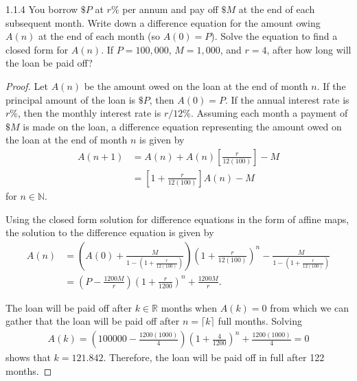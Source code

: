 \begin{problem}{1.1.4}
  You borrow $\$P$ at $r\%$ per annum
  and pay off $\$M$ at the end of each subsequent month. Write down a difference
  equation for the amount owing $A(n)$ at the end of each month (so $A(0) = P$).
  Solve the equation to find a closed form for $A(n)$. If $P = 100,000$, $M = 1,000$,
  and $r=4$, after how long will the loan be paid off?
\end{problem}

\begin{proof}
  Let $A(n)$ be the amount owed on the loan at the end of month $n$. If the principal
  amount of the loan is $\$P$, then $A(0) = P$. If the annual interest rate is $r\%$,
  then the monthly interest rate is $r/12 \%$. Assuming each month a payment of $\$M$ is
  made on the loan, a difference equation representing the amount owed on the loan
  at the end of month $n$ is given by
  \begin{align*}
    A(n + 1) &= A(n) + A(n)\left[\frac{r}{12(100)}\right] - M \\
    &= \left[1 + \frac{r}{12(100)}\right]A(n) - M
  \end{align*}
  for $n\in\mathbb{N}$.

  Using the closed form solution for difference equations in the form of affine maps,
  the solution to the difference equation is given by
  \begin{align*}
    A(n) &= \left(A(0) + \frac{M}{1 - \left(1 + \frac{r}{12(100)}\right)}\right) \left(1 + \frac{r}{12(100)}\right)^n - \frac{M}{1 - \left(1 + \frac{r}{12(100)}\right)} \\
    &= \left(P - \frac{1200M}{r}\right)\left(1 + \frac{r}{1200}\right)^n + \frac{1200M}{r}.
  \end{align*}

  The loan will be paid off after $k \in \mathbb{R}$ months when $A(k) = 0$ from which
  we can gather that the loan will be paid off after $n = \lceil k \rceil$ full months.
  Solving
  \begin{align*}
    A(k) = \left(100000 - \frac{1200(1000)}{4}\right)\left(1 + \frac{4}{1200}\right)^n + \frac{1200(1000)}{4} =0
  \end{align*}
  shows that $k = 121.842$. Therefore,
  the loan will be paid off in full after 122 months.
\end{proof}
\newpage
